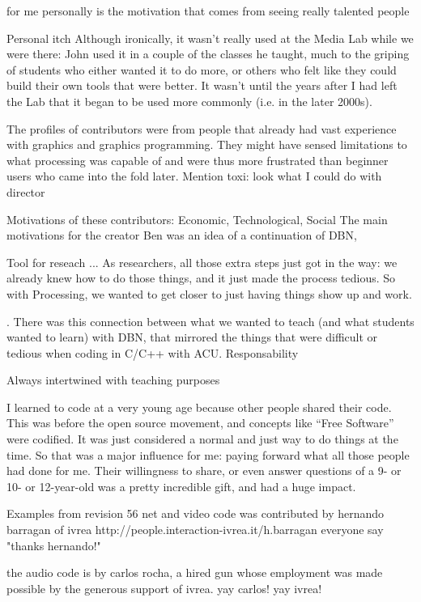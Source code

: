 for me personally is the motivation that comes from seeing really talented people

Personal itch
Although ironically, it wasn't really used at the Media Lab while we were there: John used it in a couple of the classes he taught, much to the griping of students who either wanted it to do more, or others who felt like they could build their own tools that were better. It wasn't until the years after I had left the Lab that it began to be used more commonly (i.e. in the later 2000s).

% 
The profiles of contributors were from people that already had vast experience with graphics and graphics programming. They might have sensed limitations to what processing was capable of and were thus more frustrated than beginner users who came into the fold later. Mention toxi: look what I could do with director

Motivations of these contributors:
Economic, Technological, Social
The main motivations for the creator Ben was an idea of a continuation of DBN, 

Tool for reseach ... 
As researchers, all those extra steps just got in the way: we already knew how to do those things, and it just made the process tedious. So with Processing, we wanted to get closer to just having things show up and work.

. There was this connection between what we wanted to teach (and what students wanted to learn) with DBN, that mirrored the things that were difficult or tedious when coding in C/C++ with ACU.
Responsability

Always intertwined with teaching purposes

I learned to code at a very young age because other people shared their code. This was before the open source movement, and concepts like “Free Software” were codified. It was just considered a normal and just way to do things at the time. So that was a major influence for me: paying forward what all those people had done for me. Their willingness to share, or even answer questions of a 9- or 10- or 12-year-old was a pretty incredible gift, and had a huge impact.

Examples from revision 56
net and video code was contributed by hernando barragan of ivrea
http://people.interaction-ivrea.it/h.barragan
everyone say "thanks hernando!"

the audio code is by carlos rocha, a hired gun whose 
employment was made possible by the generous support of ivrea. 
yay carlos! yay ivrea!

